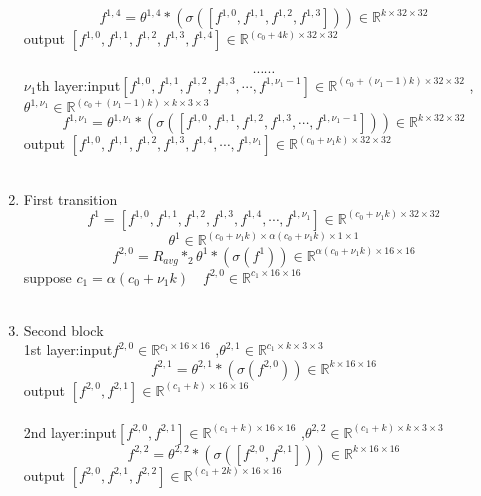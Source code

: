 \begin{enumerate}
$$ f^{1,4}=\theta^{1,4} \ast (\sigma([f^{1,0},f^{1,1},f^{1,2},f^{1,3}]))\in \mathbb{R}^{k\times 32\times 32}$$
\quad\quad\quad\quad\quad output $[f^{1,0},f^{1,1}, f^{1,2},f^{1,3},f^{1,4}] \in \mathbb{R}^{(c_0+4k)\times 32\times 32}$
\\ \hspace*{\fill} \\
$$\cdots\cdots$$
$\nu_1$th layer:\quad input$[f^{1,0},f^{1,1},f^{1,2},f^{1,3},\cdots,f^{1,\nu_1-1}] \in \mathbb{R}^{(c_0+(\nu_1-1)k)\times 32\times 32}$ ,$\theta^{1,\nu_1} \in \mathbb{R}^{ (c_0+(\nu_1-1)k)\times k\times3\times 3}$
$$ f^{1,\nu_1}=\theta^{1,\nu_1} \ast (\sigma([f^{1,0},f^{1,1},f^{1,2},f^{1,3},\cdots,f^{1,\nu_1-1}]))\in \mathbb{R}^{k\times 32\times 32}$$
\quad\quad\quad\quad\quad output $[f^{1,0},f^{1,1}, f^{1,2},f^{1,3},f^{1,4},\cdots,f^{1,\nu_1}] \in \mathbb{R}^{(c_0+\nu_1k)\times 32\times 32}$
\\ \hspace*{\fill} \\
\item First transition
$$f^1 = [f^{1,0},f^{1,1}, f^{1,2},f^{1,3},f^{1,4},\cdots,f^{1,\nu_1}] \in \mathbb{R}^{(c_0+\nu_1k)\times 32\times 32}$$
$$\theta^1 \in \mathbb{R}^{(c_0+\nu_1k)\times \alpha(c_0+\nu_1k)\times 1\times 1 }$$
$$f^{2,0}=R_{avg} \ast_2 \theta^{1} \ast (\sigma(f^1))\in \mathbb{R}^{\alpha(c_0+\nu_1k)\times 16\times 16}$$
suppose $c_1 = \alpha(c_0+\nu_1k)\quad f^{2,0}\in \mathbb{R}^{c_1\times 16\times 16}$
\\ \hspace*{\fill} \\
\item Second block\\
1st layer:\quad input$f^{2,0}\in \mathbb{R}^{c_1\times 16\times 16}$ ,$\theta^{2,1} \in \mathbb{R}^{c_1\times k\times3\times 3 }$
$$f^{2,1}=\theta^{2,1} \ast (\sigma(f^{2,0}))\in \mathbb{R}^{k\times 16\times 16}$$
\quad\quad\quad\quad\quad output $[f^{2,0},f^{2,1}] \in \mathbb{R}^{(c_1+k)\times 16\times 16}$
\\ \hspace*{\fill} \\
2nd layer:\quad input$[f^{2,0},f^{2,1}] \in \mathbb{R}^{(c_1+k)\times 16\times 16}$ ,$\theta^{2,2} \in \mathbb{R}^{(c_1+k)\times k\times 3\times 3}$
$$ f^{2,2}=\theta^{2,2} \ast (\sigma([f^{2,0},f^{2,1}]))\in \mathbb{R}^{k\times 16\times 16}$$
\quad\quad\quad\quad\quad output $[f^{2,0},f^{2,1}, f^{2,2}] \in \mathbb{R}^{(c_1+2k)\times 16\times 16}$
\\ \hspace*{\fill} \\

\end{enumerate}

